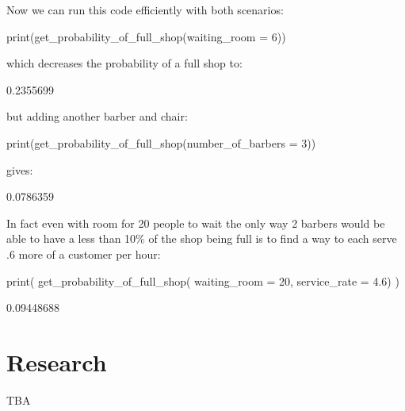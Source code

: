 Now we can run this code efficiently with both scenarios:

\begin{Rin}
print(get_probability_of_full_shop(waiting_room = 6))
\end{Rin}

which decreases the probability of a full shop to:

\begin{Rout}
[1] 0.2355699
\end{Rout}

but adding another barber and chair:

\begin{Rin}
print(get_probability_of_full_shop(number_of_barbers = 3))
\end{Rin}

gives:

\begin{Rout}
[1] 0.0786359
\end{Rout}

In fact even with room for 20 people to wait the only way 2 barbers would be
able to have a less than 10\% of the shop being full is to find a way to each
serve .6 more of a customer per hour:

\begin{Rin}
print(
    get_probability_of_full_shop(
        waiting_room = 20,
        service_rate = 4.6)
        )
\end{Rin}

\begin{Rout}
[1] 0.09448688
\end{Rout}

\section{Research}\label{sec:research}

TBA
